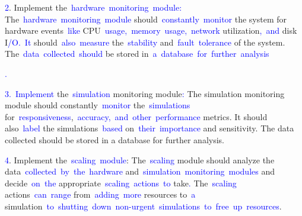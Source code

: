 \documentclass{article}
\begin{document}
\begin{tcolorbox}[colframe=black,colback=white]
{}\textcolor{blue}{2}. Implement the\textcolor{blue}{~hardware}\textcolor{blue}{~monitoring}\textcolor{blue}{~module}\textcolor{blue}{:} The\textcolor{blue}{~hardware}\textcolor{blue}{~monitoring}\textcolor{blue}{~module} should\textcolor{blue}{~constantly}\textcolor{blue}{~monitor} the system for hardware events\textcolor{blue}{~like} CPU\textcolor{blue}{~usage}\textcolor{blue}{,}\textcolor{blue}{~memory}\textcolor{blue}{~usage}\textcolor{blue}{,}\textcolor{blue}{~network} utilization\textcolor{blue}{,}\textcolor{blue}{~and} disk I\textcolor{blue}{/O}\textcolor{blue}{.}\textcolor{blue}{~It} should\textcolor{blue}{~also}\textcolor{blue}{~measure} the\textcolor{blue}{~stability} and\textcolor{blue}{~fault}\textcolor{blue}{~tolerance} of the system. The\textcolor{blue}{~data}\textcolor{blue}{~collected}\textcolor{blue}{~should} be stored in\textcolor{blue}{~a}\textcolor{blue}{~database}\textcolor{blue}{~for}\textcolor{blue}{~further}\textcolor{blue}{~analysis}\textcolor{blue}{.

}\textcolor{blue}{3}\textcolor{blue}{.}\textcolor{blue}{~Implement} the\textcolor{blue}{~simulation} monitoring module\textcolor{blue}{:} The simulation monitoring module should constantly\textcolor{blue}{~monitor} the\textcolor{blue}{~simulations} for\textcolor{blue}{~responsiveness},\textcolor{blue}{~accuracy}\textcolor{blue}{,}\textcolor{blue}{~and}\textcolor{blue}{~other}\textcolor{blue}{~performance} metrics. It should also\textcolor{blue}{~label} the simulations\textcolor{blue}{~based} on\textcolor{blue}{~their}\textcolor{blue}{~importance} and sensitivity. The data collected should be stored in a database for further analysis.

\textcolor{blue}{4}. Implement the\textcolor{blue}{~scaling}\textcolor{blue}{~module}: The\textcolor{blue}{~scaling} module should analyze the data\textcolor{blue}{~collected}\textcolor{blue}{~by}\textcolor{blue}{~the}\textcolor{blue}{~hardware} and\textcolor{blue}{~simulation}\textcolor{blue}{~monitoring}\textcolor{blue}{~modules} and decide\textcolor{blue}{~on}\textcolor{blue}{~the} appropriate\textcolor{blue}{~scaling}\textcolor{blue}{~actions}\textcolor{blue}{~to} take\textcolor{blue}{.} The\textcolor{blue}{~scaling} actions\textcolor{blue}{~can}\textcolor{blue}{~range} from\textcolor{blue}{~adding}\textcolor{blue}{~more} resources to\textcolor{blue}{~a} simulation\textcolor{blue}{~to}\textcolor{blue}{~shutting}\textcolor{blue}{~down}\textcolor{blue}{~non}\textcolor{blue}{-}\textcolor{blue}{urgent}\textcolor{blue}{~simulations}\textcolor{blue}{~to}\textcolor{blue}{~free}\textcolor{blue}{~up}\textcolor{blue}{~resources}.


\end{tcolorbox}
\end{document}
